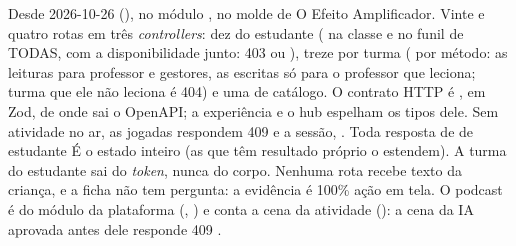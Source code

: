 Desde 2026-10-26 (), no módulo , no molde de O
Efeito Amplificador. Vinte e quatro rotas em três \emph{controllers}: dez do
estudante ( na classe e  no
funil de TODAS, com a disponibilidade junto: 403  ou
), treze por turma ( por método: as
leituras para professor e gestores, as escritas só para o professor que
leciona; turma que ele não leciona é 404) e uma de catálogo. O contrato HTTP é
, em Zod, de onde sai o OpenAPI; a experiência e o
hub espelham os tipos dele. Sem atividade no ar, as jogadas respondem 409
 e a sessão, . Toda resposta de
 de estudante É o estado inteiro (as que têm resultado próprio o
estendem). A turma do estudante sai do \emph{token}, nunca do corpo. Nenhuma
rota recebe texto da criança, e a ficha não tem pergunta: a evidência é 100\%
ação em tela. O podcast é do módulo da plataforma
(, ) e conta a cena da
atividade (): a cena da IA aprovada antes dele responde 409
.

